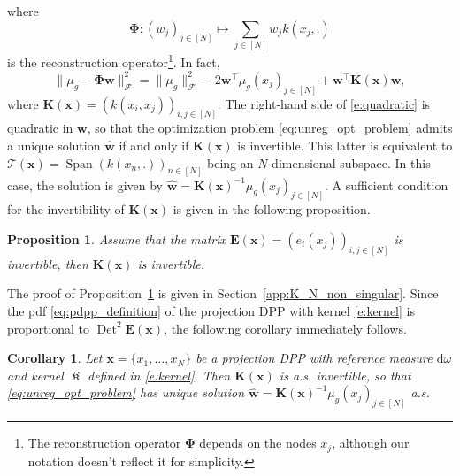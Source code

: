 \documentclass[twoside,11pt]{book}
\newtheorem{corollary}{Corollary}
\newtheorem{proposition}{Proposition}
\DeclareMathOperator{\Det}{Det}
\DeclareMathOperator{\Span}{\mathrm{Span}}
\DeclareMathOperator{\Tran}{\intercal}
\DeclareMathOperator*{\KDPP}{\mathfrak{K}}
\begin{document}
where
\begin{equation}
	\bm{\Phi}:(w_{j})_{j \in [N]} \mapsto \sum_{j \in [N]} w_{j} k(x_{j},.)
\end{equation}
 is the reconstruction operator\footnote{The reconstruction operator $\bm{\Phi}$ depends on the nodes $x_{j}$, although our notation doesn't reflect it for simplicity.}.
 In fact, \begin{equation}
\| \mu_{g} - \bm{\Phi} \bm{w} \|_{\mathcal{F}}^{2} = \|\mu_{g}\|_{\mathcal{F}}^{2} - 2 \bm{w}^{\Tran} \mu_{g}(x_{j})_{j \in [N]} + \bm{w}^{\Tran} \bm{K}(\bm{x}) \bm{w},
\label{e:quadratic}
\end{equation}
where $\bm{K}(\bm{x}) = (k(x_{i},x_{j}))_{i,j \in [N]}$. The right-hand side of \eqref{e:quadratic} is quadratic in $\bm{w}$, so that the optimization problem \eqref{eq:unreg_opt_problem}
admits a unique solution $\hat{\bm{w}}$ if and only if $\bm{K}(\bm{x})$ is invertible. This latter is equivalent to $\mathcal{T}(\bm{x}) = \Span (k(x_{n},.))_{n \in [N]}$ being an $N$-dimensional subspace. In this case, the solution is given by $\hat{\bm{w}} = \bm{K}(\bm{x})^{-1}\mu_{g}(x_{j})_{j \in [N]}$. A sufficient condition for the invertibility of $\bm{K}(\bm{x})$ is given in the following proposition.
\begin{proposition}\label{prop:K_N_non_singular}
Assume that the matrix
$\bm{E}(\bm{x}) = (e_{i}(x_{j}))_{ i,j \in [N]}$ is invertible, then $\bm{K}(\bm{x})$ is invertible.
\end{proposition}
The proof of Proposition~\ref{prop:K_N_non_singular} is given in Section~\ref{app:K_N_non_singular}.
Since the pdf \eqref{eq:pdpp_definition} of the projection DPP with kernel \eqref{e:kernel} is proportional to $\Det^2\bm{E}(\bm{x})$, the following corollary immediately follows.

\begin{corollary}
  Let $\bm{x} = \{x_{1}, \dots , x_{N}\}$ be a projection DPP with reference measure $\mathrm{d}\omega$ and kernel $\KDPP$ defined in \eqref{e:kernel}. Then $\bm{K}(\bm{x})$ is a.s. invertible, so that \eqref{eq:unreg_opt_problem} has unique solution $\hat{\bm{w}} = \bm{K}(\bm{x})^{-1}\mu_{g}(x_{j})_{j \in [N]}$ a.s.
\label{c:regularization}
\end{corollary}
\end{document}
